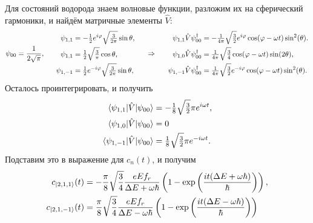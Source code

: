 Для состояний водорода знаем волновые функции, разложим их на сферический гармоники, и найдём матричные элементы $\hat{V}$:
\begin{equation*}
    \psi_{00} = \frac{1}{2\sqrt{\pi}},
    \hspace{5 mm} 
    \left.\begin{aligned}
        \psi_{1,1} &= - \tfrac{1}{2} e^{i \varphi} \sqrt{\tfrac{3}{2\pi}} \sin \theta, \\
        \psi_{1,1} &= \tfrac{1}{2} \sqrt{\tfrac{3}{\pi}} \cos \theta, \\ 
        \psi_{1,-1} &=  \tfrac{1}{2} e^{-i \varphi} \sqrt{\tfrac{3}{2\pi}} \sin \theta, \\
    \end{aligned}\right.
    \hspace{0.5cm} \Rightarrow \hspace{0.5cm}
    \left.\begin{aligned}
        \psi_{1,1} \hat{V} \psi_{00}^{\dag} &= -\tfrac{1}{4\pi} \sqrt{\tfrac{3}{2}} e^{i \varphi} \cos(\varphi - \omega t) \sin^2(\theta). \\
        \psi_{1,0} \hat{V} \psi_{00}^{\dag} &= \tfrac{1}{4\pi} \sqrt{\tfrac{3}{4}} \cos(\varphi - \omega t) \sin (2\theta), \\
        \psi_{1,-1} \hat{V} \psi_{00}^{\dag} &= \tfrac{1}{4\pi} \sqrt{\tfrac{3}{2}} e^{-i \varphi} \cos(\varphi - \omega t) \sin^2(\theta). \\
    \end{aligned}\right.
\end{equation*}
Осталось проинтегрировать, и получить
\begin{align*}
    \bk{\psi_{1,1}}[\hat{V}]{\psi_{00}} &= -\tfrac{1}{8} \sqrt{\tfrac{3}{2}} \pi  e^{i \omega t}, \\
    \bk{\psi_{1,0}}[\hat{V}]{\psi_{00}} &= 0 \\
    \bk{\psi_{1,-1}}[\hat{V}]{\psi_{00}} &= \tfrac{1}{8} \sqrt{\tfrac{3}{2}} \pi  e^{-i \omega t}.
\end{align*}
Подставим это в выражение для $c_n (t)$, и получим
\begin{align*}
    c_{\left| 2,1,1 \right\rangle} (t) &= -\frac{\pi}{8} \sqrt{\frac{3}{4}} \frac{e E f_r}{\Delta E + \omega \hbar}
    \left(1 - \exp\left(\frac{i t (\Delta E + \omega \hbar)}{\hbar}\right)\right)
    , \\ 
    c_{\left| 2,1,-1 \right\rangle} (t) &= \frac{\pi}{8} \sqrt{\frac{3}{4}} \frac{e E f_r}{\Delta E - \omega \hbar}
    \left(1 - \exp\left(\frac{i t (\Delta E - \omega \hbar)}{\hbar}\right)\right)
\end{align*}
